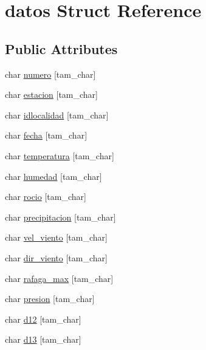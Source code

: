 \hypertarget{structdatos}{\section{datos Struct Reference}
\label{structdatos}
}
\subsection*{Public Attributes}
\begin{DoxyCompactItemize}
\item 
char \hyperlink{structdatos_a76d4b3ae2b7f06c453196625bbfdce21}{numero} \mbox{[}tam\-\_\-char\mbox{]}
\item 
char \hyperlink{structdatos_a29ea9f9a82a90d3da6775773661e5134}{estacion} \mbox{[}tam\-\_\-char\mbox{]}
\item 
char \hyperlink{structdatos_a927e448958bc1d5945ee80dc5f0bf220}{idlocalidad} \mbox{[}tam\-\_\-char\mbox{]}
\item 
char \hyperlink{structdatos_aa0c7c5c19eca865ae03abfdb0ffd03e5}{fecha} \mbox{[}tam\-\_\-char\mbox{]}
\item 
char \hyperlink{structdatos_ac60aa86adb8352bd11c92b136c252ef9}{temperatura} \mbox{[}tam\-\_\-char\mbox{]}
\item 
char \hyperlink{structdatos_a7646bd9c4887870ecf99d8b8ea085fd6}{humedad} \mbox{[}tam\-\_\-char\mbox{]}
\item 
char \hyperlink{structdatos_ac93660891013484981943e2fe32ecfc2}{rocio} \mbox{[}tam\-\_\-char\mbox{]}
\item 
char \hyperlink{structdatos_a895ca1f2cbf77067b75fcbb84fb1171c}{precipitacion} \mbox{[}tam\-\_\-char\mbox{]}
\item 
char \hyperlink{structdatos_aaa992bcb3c7b2710e7c00db890c4c60c}{vel\-\_\-viento} \mbox{[}tam\-\_\-char\mbox{]}
\item 
char \hyperlink{structdatos_a8094cc27cfac961fc5770f12a558cb75}{dir\-\_\-viento} \mbox{[}tam\-\_\-char\mbox{]}
\item 
char \hyperlink{structdatos_aee38928b36bde1b1ddede66cf1bea915}{rafaga\-\_\-max} \mbox{[}tam\-\_\-char\mbox{]}
\item 
char \hyperlink{structdatos_a3a2cc12174c5270d5f097f6e3456f429}{presion} \mbox{[}tam\-\_\-char\mbox{]}
\item 
char \hyperlink{structdatos_afb580e824f760aca0244ac3dcea00f34}{d12} \mbox{[}tam\-\_\-char\mbox{]}
\item 
char \hyperlink{structdatos_a4703a24c709b7013b569abc0ae48bb5b}{d13} \mbox{[}tam\-\_\-char\mbox{]}

\end{DoxyCompactItemize}
